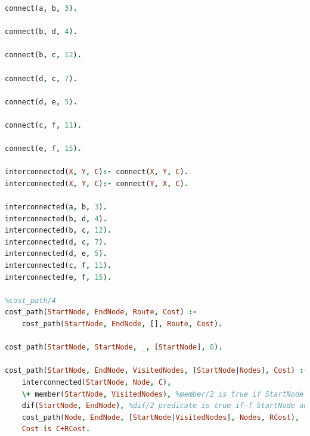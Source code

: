 \documentclass{article}
\begin{document}
\begin{lstlisting}[language=Prolog, caption=Complete Code Listing]
connect(a, b, 3).

connect(b, d, 4).

connect(b, c, 12).

connect(d, c, 7).

connect(d, e, 5).

connect(c, f, 11).

connect(e, f, 15).

interconnected(X, Y, C):- connect(X, Y, C).
interconnected(X, Y, C):- connect(Y, X, C).

interconnected(a, b, 3).
interconnected(b, d, 4).
interconnected(b, c, 12).
interconnected(d, c, 7).
interconnected(d, e, 5).
interconnected(c, f, 11).
interconnected(e, f, 15).

%cost_path/4
cost_path(StartNode, EndNode, Route, Cost) :-
    cost_path(StartNode, EndNode, [], Route, Cost).

cost_path(StartNode, StartNode, _, [StartNode], 0).

cost_path(StartNode, EndNode, VisitedNodes, [StartNode|Nodes], Cost) :-
    interconnected(StartNode, Node, C),
    \+ member(StartNode, VisitedNodes), %member/2 is true if StartNode is member of VisitedNodes list
    dif(StartNode, EndNode), %dif/2 predicate is true if-f StartNode and EndNode are different
    cost_path(Node, EndNode, [StartNode|VisitedNodes], Nodes, RCost),
    Cost is C+RCost.
\end{lstlisting}
\end{document}
